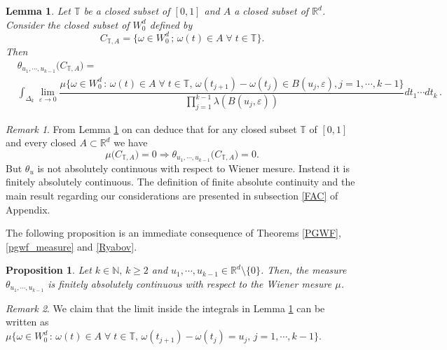 \documentclass[]{interact}
\newcommand{\R}{{\mathbb{R}}}
\newcommand{\1}{\mathbf{1}}
\newcommand{\ve}{\varepsilon}
\theoremstyle{plain}%
\newtheorem{lem}[thm]{Lemma}
\newtheorem{prop}[thm]{Proposition}
\theoremstyle{definition}
\theoremstyle{remark}
\newtheorem{remark}{Remark}
\begin{document}
\begin{lem}\label{lem2} Let $\mathbb{T}$ be a closed subset of $[0,1]$ and $A$ a closed subset of $\R^{d}$. Consider the closed subset of $W_0^d$ defined by 
$$ C_{\mathbb{T},A}=\{ \omega \in W_0^d\, ;\, \omega (t)\in A \; \forall \; t\in \mathbb{T}\}. $$
Then
\begin{align*}
&\theta_{u_1,\cdots,u_{k-1}}\big(C_{\mathbb{T},A}\big)=\\
&\int_{\Delta_k  } 
  \lim_{\ve \to 0} \dfrac{ \mu \big\{ \omega \in W_0^d\, :\,  \omega (t)\in A \; \forall \; t\in \mathbb{T}, \, \omega(t_{j+1})- \omega(t_j)\in B(u_j,\ve) ,j=1,\cdots,k-1\big\} }{\prod_{j=1}^{k-1} \lambda (B(u_j,\ve)) } dt_1\cdots dt_k  \,.
\end{align*} 
\end{lem}









\begin{remark}\label{rem10}
From Lemma \ref{lem2} on can deduce that for any closed subset $\mathbb{T}$ of $[0,1]$ and every closed $A\subset \R^d$ we have 
$$ \mu \big( C_{\mathbb{T},A} \big)=0 \Rightarrow \theta_{u_1,\cdots,u_{k-1}}  \big( C_{\mathbb{T},A} \big)=0. $$
But $\theta_u$ is not absolutely continuous with respect to Wiener mesure. Instead it is finitely absolutely continuous. The definition of finite absolute continuity and the main result regarding our considerations are presented in subsection \ref{FAC} of Appendix.
\end{remark}



\noindent The following proposition is an immediate consequence of Theorems \ref{PGWF}, \ref{pgwf_measure} and \ref{Ryabov}.
\begin{prop}\label{fac} Let $k\in \mathbb{N},\, k\geqslant 2$ and $u_1,\cdots, u_{k-1}\in\R^d\setminus\{0\}$. Then, the measure $\theta_{u_1,\cdots,u_{k-1}}$ is finitely absolutely continuous with respect to the Wiener mesure $\mu$.
\end{prop}

\begin{remark}\label{rem11}
We claim that the limit inside the integrals in Lemma \ref{lem2} can be written as $ \mu \big\{ \omega \in W_0^d\, :\,  \omega (t)\in A  \; \forall \; t\in \mathbb{T}, \, \omega(t_{j+1})- \omega(t_j)=u_j,\,j=1,\cdots,k-1\big\} .$
\end{remark}
\end{document}
